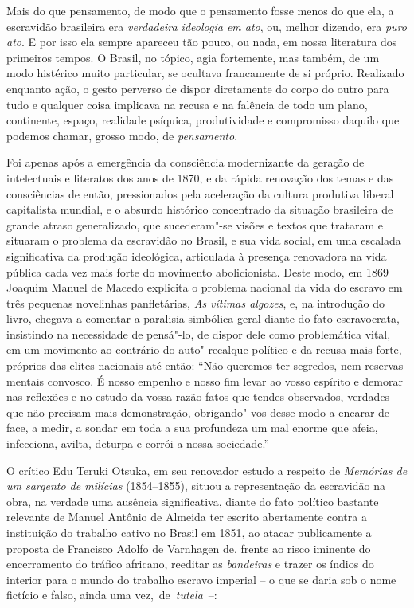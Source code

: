 Mais do que pensamento, de modo que o pensamento fosse menos do que ela,
a escravidão brasileira era \emph{verdadeira ideologia em ato}, ou,
melhor dizendo, era \emph{puro} \emph{ato}. E por isso ela sempre
apareceu tão pouco, ou nada, em nossa literatura dos primeiros tempos. O
Brasil, no tópico, agia fortemente, mas também, de um modo histérico
muito particular, se ocultava francamente de si próprio. Realizado
enquanto ação, o gesto perverso de dispor diretamente do corpo do outro
para tudo e qualquer coisa implicava na recusa e na falência de todo um
plano, continente, espaço, realidade psíquica, produtividade e
compromisso daquilo que podemos chamar, grosso modo, de
\emph{pensamento}.

Foi apenas após a emergência da consciência modernizante da geração de
intelectuais e literatos dos anos de 1870, e da rápida renovação dos
temas e das consciências de então, pressionados pela aceleração da
cultura produtiva liberal capitalista mundial, e o absurdo histórico
concentrado da situação brasileira de grande atraso generalizado, que
sucederam"-se visões e textos que trataram e situaram o problema da
escravidão no Brasil, e sua vida social, em uma escalada significativa
da produção ideológica, articulada à presença renovadora na vida pública
cada vez mais forte do movimento abolicionista. Deste modo, em 1869
Joaquim Manuel de Macedo explicita o problema nacional da vida do
escravo em três pequenas novelinhas panfletárias, \emph{As vítimas
algozes}, e, na introdução do livro, chegava a comentar a paralisia
simbólica geral diante do fato escravocrata, insistindo na necessidade
de pensá"-lo, de dispor dele como problemática vital, em um movimento ao
contrário do auto"-recalque político e da recusa mais forte, próprios das
elites nacionais até então: ``Não queremos ter segredos, nem reservas
mentais convosco. É nosso empenho e nosso fim levar ao vosso espírito e
demorar nas reflexões e no estudo da vossa razão fatos que tendes
observados, verdades que não precisam mais demonstração, obrigando"-vos
desse modo a encarar de face, a medir, a sondar em toda a sua profundeza
um mal enorme que afeia, infecciona, avilta, deturpa e corrói a nossa
sociedade.''

O crítico Edu Teruki Otsuka, em seu renovador estudo a respeito de
\emph{Memórias de um sargento de milícias} (1854--1855), situou a
representação da escravidão na obra, na verdade uma ausência
significativa, diante do fato político bastante relevante de Manuel
Antônio de Almeida ter escrito abertamente contra a instituição do
trabalho cativo no Brasil em 1851, ao atacar publicamente a proposta de
Francisco Adolfo de Varnhagen de, frente ao risco iminente do
encerramento do tráfico africano, reeditar as \emph{bandeiras} e trazer
os índios do interior para o mundo do trabalho escravo imperial -- o que
se daria sob o nome fictício e falso, ainda uma vez,~de~\emph{tutela}~--: 

